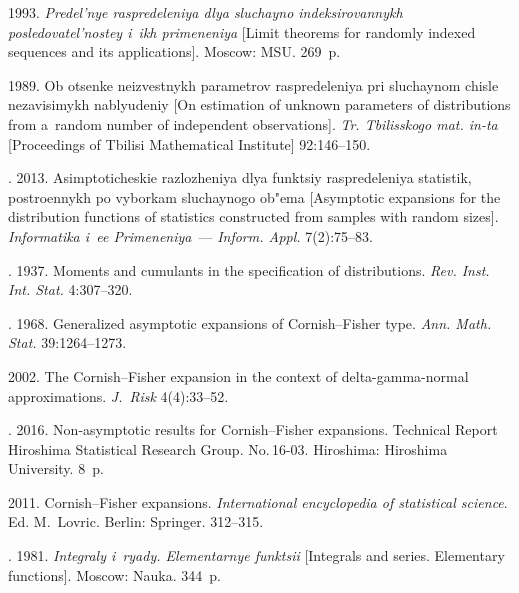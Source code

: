   \begin{multicols}{2}

\renewcommand{\bibname}{\protect\rmfamily References}

{\small\frenchspacing
 {%
 \begin{thebibliography}{9}

 1993. \textit{Predel'nye raspredeleniya 
dlya sluchayno indeksirovannykh posledovatel'nostey i~ikh primeneniya}
[Limit theorems for randomly indexed sequences 
and its applications]. Moscow: MSU. 269~p.

 1989. Ob otsenke neizvestnykh parametrov 
raspredeleniya pri sluchaynom chisle nezavisimykh nablyudeniy 
[On estimation of unknown parameters of distributions from a~random number 
of independent observations]. \textit{Tr. Tbilisskogo mat. in-ta}
[Proceedings of Tbilisi Mathematical Institute] 92:146--150.

. 
2013. Asimptoticheskie razlozheniya dlya funktsiy raspredeleniya statistik, 
postroennykh po vyborkam sluchaynogo ob"ema 
[Asymptotic expansions for the distribution functions of statistics 
constructed from samples with random sizes]. 
\textit{Informatika i~ee Primeneniya}~--- \textit{Inform. Appl.} 7(2):75--83. 

. 1937. Moments and cumulants 
in the specification of distributions. \textit{Rev. Inst. Int. Stat.} 4:307--320.

. 1968. Generalized asymptotic expansions 
of Cornish--Fisher type. \textit{Ann. Math. Stat.} 39:1264--1273.

 2002. The Cornish--Fisher expansion in the context of 
delta-gamma-normal approximations. \textit{J.~Risk} 4(4):33--52.

. 2016. 
Non-asymptotic results for Cornish--Fisher expansions. 
Technical Report Hiroshima Statistical Research Group. No.\,16-03. 
Hiroshima: Hiroshima University. 8~p. 

 2011. Cornish--Fisher expansions.
\textit{International encyclopedia of statistical science}.
Ed. M.~Lovric. Berlin: Springer. 312--315.

. 1981. 
\textit{Integraly i~ryady. Elementarnye funktsii} [Integrals and series. Elementary functions]. 
Moscow: Nauka. 344~p.

\end{thebibliography}

 }
 }

\end{multicols}

